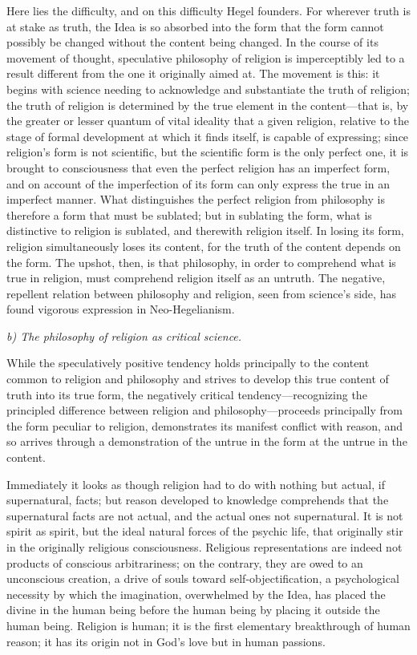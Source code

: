 \documentclass[12pt,a4paper]{article}
\begin{document}
Here lies the difficulty, and on this difficulty Hegel founders.
For wherever truth is at stake as truth, the Idea is so absorbed
into the form that the form cannot possibly be changed without
the content being changed. In the course of its movement of
thought, speculative philosophy of religion is imperceptibly led
to a result different from the one it originally aimed at. The
movement is this: it begins with science needing to acknowledge
and substantiate the truth of religion; the truth of religion is
determined by the true element in the content---that is, by the
greater or lesser quantum of vital ideality that a given
religion, relative to the stage of formal development at which
it finds itself, is capable of expressing; since religion's form
is not scientific, but the scientific form is the only perfect
one, it is brought to consciousness that even the perfect
religion has an imperfect form, and on account of the
imperfection of its form can only express the true in an
imperfect manner. What distinguishes the perfect religion from
philosophy is therefore a form that must be sublated; but in
sublating the form, what is distinctive to religion is sublated,
and therewith religion itself. In losing its form, religion
simultaneously loses its content, for the truth of the content
depends on the form. The upshot, then, is that philosophy, in
order to comprehend what is true in religion, must comprehend
religion itself as an untruth. The negative, repellent relation
between philosophy and religion, seen from science's side, has
found vigorous expression in Neo-Hegelianism.

\medskip

\noindent\textit{b) The philosophy of religion as critical science.}

\medskip

While the speculatively positive tendency holds principally to
the content common to religion and philosophy and strives to
develop this true content of truth into its true form, the
negatively critical tendency---recognizing the principled
difference between religion and philosophy---proceeds principally
from the form peculiar to religion, demonstrates its manifest
conflict with reason, and so arrives through a demonstration of
the untrue in the form at the untrue in the content.

Immediately it looks as though religion had to do with nothing
but actual, if supernatural, facts; but reason developed to
knowledge comprehends that the supernatural facts are not actual,
and the actual ones not supernatural. It is not spirit as spirit,
but the ideal natural forces of the psychic life, that originally
stir in the originally religious consciousness. Religious
representations are indeed not products of conscious
arbitrariness; on the contrary, they are owed to an unconscious
creation, a drive of souls toward self-objectification, a
psychological necessity by which the imagination, overwhelmed by
the Idea, has placed the divine in the human being before the
human being by placing it outside the human being. Religion is
human; it is the first elementary breakthrough of human reason;
it has its origin not in God's love but in human passions.
\end{document}
